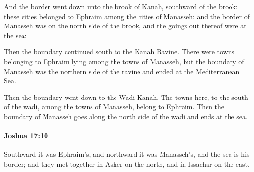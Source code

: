 			\begin{versebox}
					\item[BHS] 
					\item[ASV] And the border went down unto the brook of Kanah, southward of the brook: these cities belonged to Ephraim among the cities of Manasseh: and the border of Manasseh was on the north side of the brook, and the goings out thereof were at the sea:
					\item[NIV] Then the boundary continued south to the Kanah Ravine. There were towns belonging to Ephraim lying among the towns of Manasseh, but the boundary of Manasseh was the northern side of the ravine and ended at the Mediterranean Sea.
					\item[NRSV] Then the boundary went down to the Wadi Kanah. The towns here, to the south of the wadi, among the towns of Manasseh, belong to Ephraim. Then the boundary of Manasseh goes along the north side of the wadi and ends at the sea.
			\end{versebox}

		\paragraph{Joshua 17:10} %
			\label{JOSHUA-17-10}

			Southward it was Ephraim’s, and northward it was Manasseh’s, and the sea is his border; and they met together in Asher on the north, and in Issachar on the east.

